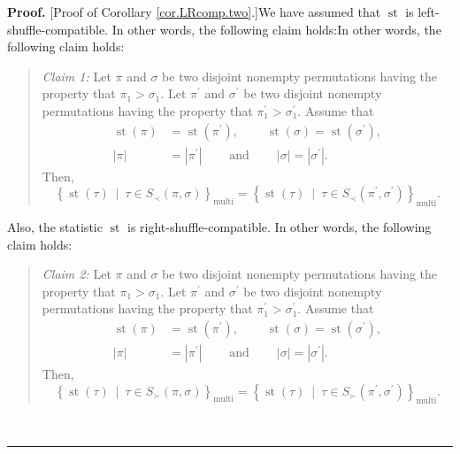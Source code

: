 \documentclass[numbers=enddot,12pt,final,onecolumn,notitlepage]{scrartcl}%
\theoremstyle{definition}
\newenvironment{statement}{\begin{quote}}{\end{quote}}
\newenvironment{proof}[1][Proof]{\noindent\textbf{#1.} }{\ \rule{0.5em}{0.5em}}
\newenvironment{verlong}{}{}
\begin{document}
\begin{verlong}
\begin{proof}
[Proof of Corollary \ref{cor.LRcomp.two}.]We have assumed that
$\operatorname*{st}$ is left-shuffle-compatible. In other words, the following
claim holds:In other words, the following claim holds:

\begin{statement}
\textit{Claim 1:} Let $\pi$ and $\sigma$ be two disjoint nonempty permutations
having the property that $\pi_{1}>\sigma_{1}$. Let $\pi^{\prime}$ and
$\sigma^{\prime}$ be two disjoint nonempty permutations having the property
that $\pi_{1}^{\prime}>\sigma_{1}^{\prime}$. Assume that%
\begin{align*}
\operatorname*{st}\left(  \pi\right)   &  =\operatorname*{st}\left(
\pi^{\prime}\right)  ,\ \ \ \ \ \ \ \ \ \ \operatorname*{st}\left(
\sigma\right)  =\operatorname*{st}\left(  \sigma^{\prime}\right)  ,\\
\left\vert \pi\right\vert  &  =\left\vert \pi^{\prime}\right\vert
\ \ \ \ \ \ \ \ \ \ \text{and}\ \ \ \ \ \ \ \ \ \ \left\vert \sigma\right\vert
=\left\vert \sigma^{\prime}\right\vert .
\end{align*}
Then,
\[
\left\{  \operatorname*{st}\left(  \tau\right)  \ \mid\ \tau\in S_{\prec
}\left(  \pi,\sigma\right)  \right\}  _{\operatorname*{multi}}=\left\{
\operatorname*{st}\left(  \tau\right)  \ \mid\ \tau\in S_{\prec}\left(
\pi^{\prime},\sigma^{\prime}\right)  \right\}  _{\operatorname*{multi}}.
\]

\end{statement}

Also, the statistic $\operatorname*{st}$ is right-shuffle-compatible. In other
words, the following claim holds:

\begin{statement}
\textit{Claim 2:} Let $\pi$ and $\sigma$ be two disjoint nonempty permutations
having the property that $\pi_{1}>\sigma_{1}$. Let $\pi^{\prime}$ and
$\sigma^{\prime}$ be two disjoint nonempty permutations having the property
that $\pi_{1}^{\prime}>\sigma_{1}^{\prime}$. Assume that%
\begin{align*}
\operatorname*{st}\left(  \pi\right)   &  =\operatorname*{st}\left(
\pi^{\prime}\right)  ,\ \ \ \ \ \ \ \ \ \ \operatorname*{st}\left(
\sigma\right)  =\operatorname*{st}\left(  \sigma^{\prime}\right)  ,\\
\left\vert \pi\right\vert  &  =\left\vert \pi^{\prime}\right\vert
\ \ \ \ \ \ \ \ \ \ \text{and}\ \ \ \ \ \ \ \ \ \ \left\vert \sigma\right\vert
=\left\vert \sigma^{\prime}\right\vert .
\end{align*}
Then,
\[
\left\{  \operatorname*{st}\left(  \tau\right)  \ \mid\ \tau\in S_{\succ
}\left(  \pi,\sigma\right)  \right\}  _{\operatorname*{multi}}=\left\{
\operatorname*{st}\left(  \tau\right)  \ \mid\ \tau\in S_{\succ}\left(
\pi^{\prime},\sigma^{\prime}\right)  \right\}  _{\operatorname*{multi}}.
\]


\end{statement}
\end{proof}
\end{verlong}
\end{document}
